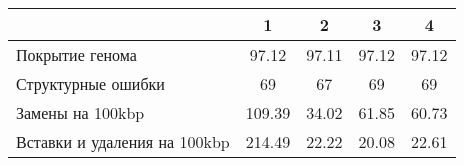 \begin{adjustbox}{center}
\begin{tabular}{|l||c|c|c|c|}
\hline
& 1 & 2 & 3 & 4 \\
\hline
\hline
Покрытие генома & \cellcolor[RGB]{241, 241, 253} 97.12 & \cellcolor[RGB]{251, 223, 223} 97.11 & \cellcolor[RGB]{254, 250, 250} 97.12 & \cellcolor[RGB]{250, 250, 254} 97.12 \\
\hline
Структурные ошибки & \cellcolor[RGB]{255, 255, 255} 69 & \cellcolor[RGB]{218, 218, 251} 67 & \cellcolor[RGB]{255, 255, 255} 69 & \cellcolor[RGB]{255, 255, 255} 69 \\
\hline
Замены на 100kbp & \cellcolor[RGB]{235, 71, 71} 109.39 & \cellcolor[RGB]{218, 218, 251} 34.02 & \cellcolor[RGB]{255, 255, 255} 61.85 & \cellcolor[RGB]{255, 255, 255} 60.73 \\
\hline
Вставки и удаления на 100kbp & \cellcolor[RGB]{235, 71, 71} 214.49 & \cellcolor[RGB]{250, 250, 254} 22.22 & \cellcolor[RGB]{218, 218, 251} 20.08 & \cellcolor[RGB]{254, 250, 250} 22.61 \\
\hline
\end{tabular}
\end{adjustbox}
